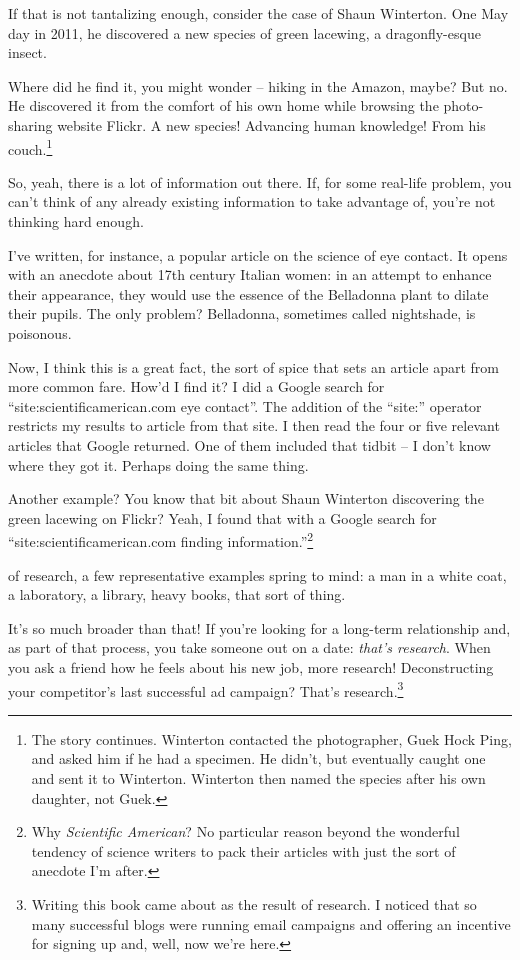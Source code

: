 If that is not tantalizing enough, consider the case of Shaun Winterton. One May day in 2011, he discovered a new species of green lacewing, a dragonfly-esque insect.

Where did he find it, you might wonder -- hiking in the Amazon, maybe? But no. He discovered it from the comfort of his own home while browsing the photo-sharing website Flickr. A new species! Advancing human knowledge! From his couch.\cite{winterton2012charismatic}\footnote{The story continues. Winterton contacted the photographer, Guek Hock Ping, and asked him if he had a specimen. He didn't, but eventually caught one and sent it to Winterton. Winterton then named the species after his own daughter, not Guek.} 

So, yeah, there is a lot of information out there. If, for some real-life problem, you can't think of any already existing information to take advantage of, you're not thinking hard enough.

I've written, for instance, a popular article on the science of eye contact. It opens with an anecdote about 17th century Italian women: in an attempt to enhance their appearance, they would use the essence of the Belladonna plant to dilate their pupils. The only problem? Belladonna, sometimes called nightshade, is poisonous.

Now, I think this is a great fact, the sort of spice that sets an article apart from more common fare. How'd I find it? I did a Google search for ``site:scientificamerican.com eye contact''. The addition of the ``site:'' operator restricts my results to article from that site. I then read the four or five relevant articles that Google returned. One of them included that tidbit -- I don't know where they got it. Perhaps doing the same thing.

Another example? You know that bit about Shaun Winterton discovering the green
lacewing on Flickr? Yeah, I found that with a Google search for
``site:scientificamerican.com finding information.''\footnote{Why
  \textit{Scientific American}? No particular reason beyond the wonderful
  tendency of science writers to pack their articles with just the sort of
  anecdote I'm after.}

 of research, a few representative examples spring
to mind: a man in a white coat, a laboratory, a library, heavy books, that sort
of thing.

It's so much broader than that! If you're looking for a long-term relationship
and, as part of that process, you take someone out on a date: \textit{that's
  research}. When you ask a friend how he feels about his new job, more
research! Deconstructing your competitor's last successful ad campaign? That's
research.\footnote{Writing this book came about as the result of research. I
  noticed that so many successful blogs were running email campaigns and
  offering an incentive for signing up and, well, now we're here.}

